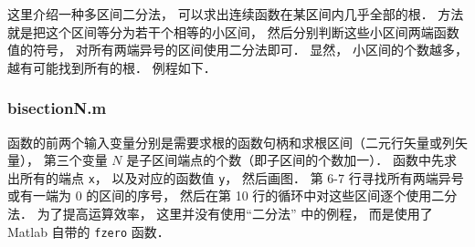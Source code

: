 

这里介绍一种多区间二分法， 可以求出连续函数在某区间内几乎全部的根． 方法就是把这个区间等分为若干个相等的小区间， 然后分别判断这些小区间两端函数值的符号， 对所有两端异号的区间使用二分法即可． 显然， 小区间的个数越多， 越有可能找到所有的根． 例程如下．

\subsubsection{bisectionN.m}


函数的前两个输入变量分别是需要求根的函数句柄和求根区间（二元行矢量或列矢量）， 第三个变量 $N$ 是子区间端点的个数（即子区间的个数加一）． 函数中先求出所有的端点 \texttt{x}， 以及对应的函数值 \texttt{y}， 然后画图． 第 6-7 行寻找所有两端异号或有一端为 0 的区间的序号， 然后在第 10 行的循环中对这些区间逐个使用二分法． 为了提高运算效率， 这里并没有使用“二分法” 中的例程， 而是使用了 Matlab 自带的 \texttt{fzero} 函数．

